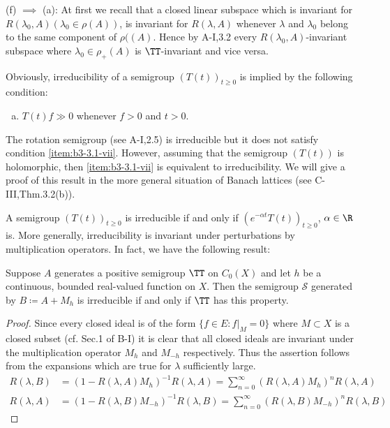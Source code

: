 (f) $\implies$ (a): At first we recall that a closed linear subspace which is invariant for $R(\lambda_0,A)  (\lambda_0 \in \rho(A))$, is invariant for $R(\lambda ,A)$
whenever $\lambda$ and $\lambda_0$ belong to the same component of $\rho((A)$. 
Hence by A-I,3.2 every $R(\lambda_0,A)$-invariant subspace where $\lambda_0 \in \rho_{+}(A)$ is 
$\TT$-invariant and vice versa.
\begin{remark}\label{rem:b3-3.2}
	Obviously, irreducibility of a semigroup $(T(t))_{t\geq 0}$ is implied by the following condition:

\begin{enumerate}[(g)]	
\item\label{item:b3-3.1-vii}
$T(t)f \gg 0$ whenever $f > 0$ and $t > 0$.
\end{enumerate}
The rotation semigroup (see A-I,2.5) is irreducible but it does not satisfy condition \ref{item:b3-3.1-vii}.
	However, assuming that the semigroup $(T(t))$ is holomorphic, then \ref{item:b3-3.1-vii}
	is equivalent to irreducibility.
	We will give a proof of this result in the more general situation of Banach lattices (see C-III,Thm.3.2(b)).
\end{remark}
A semigroup $(T(t))_{t \ge 0}$ is irreducible if and only if $(e^{-\alpha t}T(t))_{t \ge 0}$, 
$\alpha \in \R$  is. More generally, irreducibility is invariant under pertur­bations by multiplication operators. In fact, we have the following result: 
\begin{proposition}\label{prop:b3-3.3}
	Suppose $A$ generates a positive semigroup $\TT$ on $C_{0}(X)$ and let $h$ be a continuous, bounded real-valued function on $X$.
	Then the semigroup $\mathcal{S}$ generated by $B \coloneqq A + M_{h}$ is irreducible if and only if\/ $\TT$ has this property.
\end{proposition}
%
%
\begin{proof}
	Since every closed ideal is of the form $\{f \in E : f|_{M} = 0\}$ where $M \subset X$ is a closed subset (cf. Sec.1 of B-I) it is clear that all closed ideals are invariant under the multiplication operator $M_{h}$ and $M_{-h}$ respectively.
	Thus the assertion follows from the expansions which are true for $\lambda$ sufficiently large.
\begin{align*}
R(\lambda,B) &= (1 - R(\lambda,A)M_{h})^{-1}R(\lambda,A) 
	= \sum_{n=0}^{\infty} (R(\lambda,A)M_{h})^{n}R(\lambda,A) \\
R(\lambda,A) &= (1 - R(\lambda,B)M_{-h})^{-1}R(\lambda,B) = \sum_{n=0}^{\infty} (R(\lambda,B)M_{-h})^{n}R(\lambda,B)
\end{align*} 
\end{proof}
